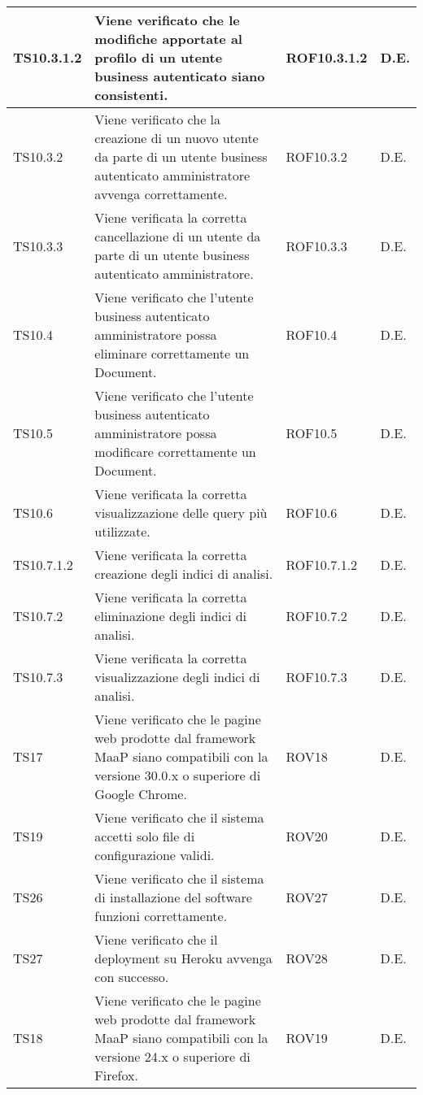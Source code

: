 \begin{center}
\begin{longtable}{|p{2cm}|p{7cm}|p{2cm}|p{2cm}|}
\midrule
TS10.3.1.2
& Viene verificato che le modifiche apportate al profilo di un utente business autenticato siano consistenti.
& ROF10.3.1.2
& D.E.\\


\midrule
TS10.3.2
& Viene verificato che la creazione di un nuovo utente da parte di un utente business autenticato amministratore avvenga correttamente.
& ROF10.3.2
& D.E.\\


\midrule
TS10.3.3
& Viene verificata la corretta cancellazione di un  utente da parte di un utente business autenticato amministratore.
& ROF10.3.3
& D.E.\\


\midrule
TS10.4
& Viene verificato che l'utente business autenticato amministratore possa eliminare correttamente un Document.
& ROF10.4
& D.E.\\


\midrule
TS10.5
& Viene verificato che l'utente business autenticato amministratore possa modificare correttamente un Document.
& ROF10.5
& D.E.\\


\midrule
TS10.6
& Viene verificata la corretta visualizzazione delle query più utilizzate.
& ROF10.6
& D.E.\\


\midrule
TS10.7.1.2
& Viene verificata la corretta creazione degli indici di analisi.
& ROF10.7.1.2
& D.E.\\


\midrule
TS10.7.2
& Viene verificata la corretta eliminazione degli indici di analisi.
& ROF10.7.2
& D.E.\\


\midrule
TS10.7.3
& Viene verificata la corretta visualizzazione degli indici di analisi.
& ROF10.7.3
& D.E.\\


\midrule
TS17
& Viene verificato che le pagine web prodotte dal framework MaaP siano compatibili con la versione 30.0.x o superiore di Google Chrome.
& ROV18
& D.E.\\


\midrule
TS19
& Viene verificato che il sistema accetti solo file di configurazione validi.
& ROV20
& D.E.\\


\midrule
TS26
& Viene verificato che il sistema di installazione del software funzioni correttamente.
& ROV27
& D.E.\\


\midrule
TS27
& Viene verificato che il deployment su Heroku avvenga con successo.
& ROV28
& D.E.\\


\midrule
TS18
& Viene verificato che le pagine web prodotte dal framework MaaP siano compatibili con la versione 24.x o superiore di Firefox.
& ROV19
& D.E.\\


\end{longtable}
\end{center}

